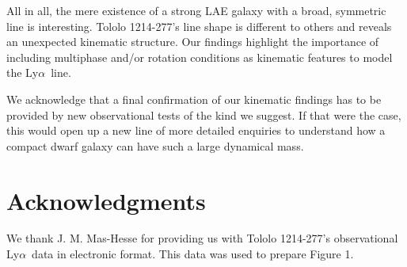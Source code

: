\documentclass[a4,useAMS,usenatbib,usegraphicx]{mn2e}
\newcommand{\tol}{Tololo 1214-277}
\newcommand{\lya}{Ly$\alpha$}
\begin{document}
All in all, the mere existence of a strong LAE galaxy with a broad,
symmetric line is interesting. 
\tol's line shape is different to others and reveals an unexpected
kinematic structure.
Our findings highlight the importance of including multiphase and/or
rotation conditions as kinematic features to model the \lya\ line.

We acknowledge that a final confirmation of our kinematic findings has
to be provided by new observational tests of the kind we suggest.
If that were the case, this would open up a new line of more detailed
enquiries to understand how a compact dwarf galaxy can have such a
large dynamical mass. 

\section*{Acknowledgments}
We thank J. M. Mas-Hesse for providing us with \tol's observational
\lya\ data \citep{mashesse03} in electronic format. This data was
used to prepare Figure 1.





\end{document}
